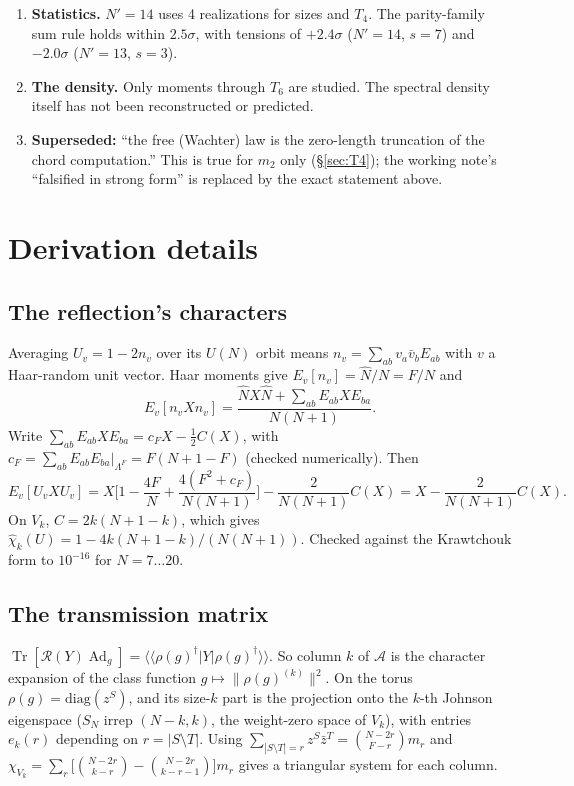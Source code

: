 \documentclass[11pt]{article}
\newcommand{\Tr}{\operatorname{Tr}}
\newcommand{\Np}{N'}
\newcommand{\Ad}{\operatorname{Ad}}
\theoremstyle{remark}
\begin{document}
\begin{enumerate}
  between double scaling and fixed $p=3$, is unknown.
\item \textbf{Statistics.} $\Np=14$ uses 4 realizations for sizes and $T_4$. The parity-family sum rule holds within
  $2.5\sigma$, with tensions of $+2.4\sigma$ ($\Np=14$, $s=7$) and $-2.0\sigma$ ($\Np=13$, $s=3$).
\item \textbf{The density.} Only moments through $T_6$ are studied. The spectral density itself has not been
  reconstructed or predicted.
\item \textbf{Superseded:} ``the free (Wachter) law is the zero-length truncation of the chord computation.'' This is
  true for $m_2$ only (\S\ref{sec:T4}); the working note's ``falsified in strong form'' is replaced by the exact
  statement above.
\end{enumerate}

\appendix
\section{Derivation details}
\subsection{The reflection's characters}\label{app:reflection}
Averaging $U_v=1-2n_v$ over its $U(N)$ orbit means $n_v=\sum_{ab}v_a\bar v_bE_{ab}$ with $v$ a Haar-random unit vector.
Haar moments give $E_v[n_v]=\hat N/N=F/N$ and
\[
E_v[n_vXn_v]=\frac{\hat NX\hat N+\sum_{ab}E_{ab}XE_{ba}}{N(N+1)} .
\]
Write $\sum_{ab}E_{ab}XE_{ba}=c_FX-\frac12C(X)$, with $c_F=\sum_{ab}E_{ab}E_{ba}|_{\Lambda^F}=F(N+1-F)$ (checked
numerically). Then
\[
E_v[U_vXU_v]=X\Big[1-\frac{4F}{N}+\frac{4(F^2+c_F)}{N(N+1)}\Big]-\frac{2}{N(N+1)}C(X)=X-\frac{2}{N(N+1)}C(X).
\]
On $V_k$, $C=2k(N+1-k)$, which gives $\hat\chi_k(U)=1-4k(N+1-k)/(N(N+1))$. Checked against the Krawtchouk form to
$10^{-16}$ for $N=7\ldots20$.

\subsection{The transmission matrix}\label{app:A}
$\Tr[\mathcal R(Y)\Ad_g]=\langle\langle\rho(g)^\dagger|Y|\rho(g)^\dagger\rangle\rangle$. So column $k$ of $\mathcal A$ is
the character expansion of the class function $g\mapsto\|\rho(g)^{(k)}\|^2$. On the torus $\rho(g)=\mathrm{diag}(z^S)$,
and its size-$k$ part is the projection onto the $k$-th Johnson eigenspace ($S_N$ irrep $(N-k,k)$, the weight-zero
space of $V_k$), with entries $e_k(r)$ depending on $r=|S\setminus T|$. Using
$\sum_{|S\setminus T|=r}z^S\bar z^T=\binom{N-2r}{F-r}m_r$ and
$\chi_{V_k}=\sum_r\big[\binom{N-2r}{k-r}-\binom{N-2r}{k-r-1}\big]m_r$ gives a triangular system for each column.
\end{document}
